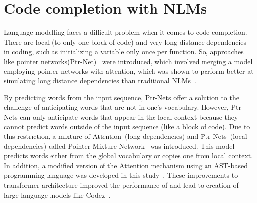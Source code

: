 \section{Code completion with NLMs}
Language modelling faces a difficult problem when it comes to code completion. There are local (to only one block of code) and very long distance dependencies in coding, such as initializing a variable only once per function. 
So, approaches like pointer networks(Ptr-Net)~\cite{pointer} were introduced, which involved merging a model employing pointer networks with attention, which was shown to perform better at simulating long distance dependencies than traditional NLMs~\cite{ccnlm}.

By predicting words from the input sequence, Ptr-Nets offer a solution to the challenge of anticipating words that are not in one's vocabulary. However, Ptr-Nets can only anticipate words that appear in the local context because they cannot predict words outside of the input sequence (like a block of code).
Due to this restriction, a mixture of Attention~(long dependencies) and Ptr-Nets~(local dependencies) called Pointer Mixture Network~\cite{ccnlm} was introduced. This model predicts words either from the global vocabulary or copies one from local context. 
In addition, a modified version of the Attention mechanism using an AST-based programming language was developed in this study~\cite{ccnlm}. These improvements to transformer architecture improved the performance of \cct{} and lead to creation of large language models like Codex~\cite{copilot}.



